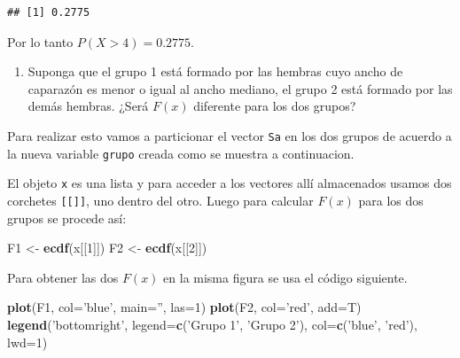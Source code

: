 \documentclass[10pt,]{krantz}
\makeatletter
\newenvironment{Shaded}{\begin{snugshade}}{\end{snugshade}}
\newcommand{\KeywordTok}[1]{\textcolor[rgb]{0.13,0.29,0.53}{\textbf{{#1}}}}
\newcommand{\DataTypeTok}[1]{\textcolor[rgb]{0.13,0.29,0.53}{{#1}}}
\newcommand{\DecValTok}[1]{\textcolor[rgb]{0.00,0.00,0.81}{{#1}}}
\newcommand{\StringTok}[1]{\textcolor[rgb]{0.31,0.60,0.02}{{#1}}}
\newcommand{\NormalTok}[1]{{#1}}
\providecommand{\tightlist}{%
  \setlength{\itemsep}{0pt}\setlength{\parskip}{0pt}}
\newenvironment{kframe}{%
\medskip{}
\setlength{\fboxsep}{.8em}
 \def\at@end@of@kframe{}%
 \ifinner\ifhmode%
  \def\at@end@of@kframe{\end{minipage}}%
  \begin{minipage}{\columnwidth}%
 \fi\fi%
 \def\FrameCommand##1{\hskip\@totalleftmargin \hskip-\fboxsep
 \colorbox{shadecolor}{##1}\hskip-\fboxsep
     \hskip-\linewidth \hskip-\@totalleftmargin \hskip\columnwidth}%
 \MakeFramed {\advance\hsize-\width
   \@totalleftmargin\z@ \linewidth\hsize
   \@setminipage}}%
 {\par\unskip\endMakeFramed%
 \at@end@of@kframe}
\renewenvironment{Shaded}{\begin{kframe}}{\end{kframe}}
\makeatother
\begin{document}
\begin{verbatim}
## [1] 0.2775
\end{verbatim}

Por lo tanto \(P(X > 4)=0.2775\).

\begin{enumerate}
\def\labelenumi{\arabic{enumi})}
\setcounter{enumi}{4}
\tightlist
\item
  Suponga que el grupo 1 está formado por las hembras cuyo ancho de
  caparazón es menor o igual al ancho mediano, el grupo 2 está formado
  por las demás hembras. ¿Será \(F(x)\) diferente para los dos grupos?
\end{enumerate}

Para realizar esto vamos a particionar el vector \texttt{Sa} en los dos
grupos de acuerdo a la nueva variable \texttt{grupo} creada como se
muestra a continuacion.

\begin{Shaded}
\end{Shaded}

El objeto \texttt{x} es una lista y para acceder a los vectores allí
almacenados usamos dos corchetes \texttt{{[}{[}{]}{]}}, uno dentro del
otro. Luego para calcular \(F(x)\) para los dos grupos se procede así:

\begin{Shaded}
\begin{Highlighting}[]
\NormalTok{F1 <-}\StringTok{ }\KeywordTok{ecdf}\NormalTok{(x[[}\DecValTok{1}\NormalTok{]])}
\NormalTok{F2 <-}\StringTok{ }\KeywordTok{ecdf}\NormalTok{(x[[}\DecValTok{2}\NormalTok{]])}
\end{Highlighting}
\end{Shaded}

Para obtener las dos \(F(x)\) en la misma figura se usa el código
siguiente.

\begin{Shaded}
\begin{Highlighting}[]
\KeywordTok{plot}\NormalTok{(F1, }\DataTypeTok{col=}\StringTok{'blue'}\NormalTok{, }\DataTypeTok{main=}\StringTok{''}\NormalTok{, }\DataTypeTok{las=}\DecValTok{1}\NormalTok{)}
\KeywordTok{plot}\NormalTok{(F2, }\DataTypeTok{col=}\StringTok{'red'}\NormalTok{, }\DataTypeTok{add=}\NormalTok{T)}
\KeywordTok{legend}\NormalTok{(}\StringTok{'bottomright'}\NormalTok{, }\DataTypeTok{legend=}\KeywordTok{c}\NormalTok{(}\StringTok{'Grupo 1'}\NormalTok{, }\StringTok{'Grupo 2'}\NormalTok{),}
       \DataTypeTok{col=}\KeywordTok{c}\NormalTok{(}\StringTok{'blue'}\NormalTok{, }\StringTok{'red'}\NormalTok{), }\DataTypeTok{lwd=}\DecValTok{1}\NormalTok{)}
\end{Highlighting}
\end{Shaded}
\end{document}
